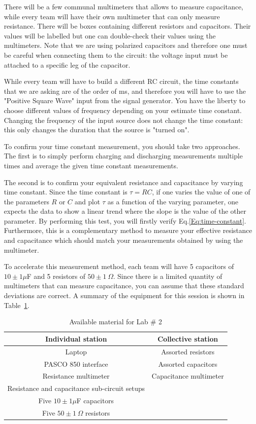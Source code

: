 \documentclass[12pt]{report}
\begin{document}
There will be a few communal multimeters that allows to measure capacitance, while every team will have their own multimeter that can only measure resistance. There will be boxes containing different resistors and capacitors. Their values will be labelled but one can double-check their values using the multimeters. Note that we are using polarized capacitors and therefore one must be careful when connecting them to the circuit: the voltage input must be attached to a specific leg of the capacitor.

While every team will have to build a different RC circuit, the time constants that we are asking are of the order of ms, and therefore you will have to use the "Positive Square Wave" input from the signal generator. You have the liberty to choose different values of frequency depending on your estimate time constant. Changing the frequency of the input source does not change the time constant: this only changes the duration that the source is "turned on".

To confirm your time constant measurement, you should take two approaches. The first is to simply perform charging and discharging measurements multiple times and average the given time constant measurements.

The second is to confirm your equivalent resistance and capacitance by varying time constant. Since the time constant is $\tau = RC$, if one varies the value of one of the parameters $R$ or $C$ and plot $\tau$ as a function of the varying parameter, one expects the data to show a linear trend where the slope is the value of the other parameter. By performing this test, you will firstly verify Eq.\ref{Eq:time-constant}. Furthermore, this is a complementary method to measure your effective resistance and capacitance which should match your measurements obtained by using the multimeter.

To accelerate this measurement method, each team will have 5 capacitors of $10\pm 1\mu$F and 5 resistors of $50\pm 1 \ \Omega$. Since there is a limited quantity of multimeters that can measure capacitance, you can assume that these standard deviations are correct. A summary of the equipment for this session is shown in Table~\ref{Tab:Lab2-material}.
\begin{table}[h]
\centering
\begin{tabular}{||c | c ||}
\hline
Individual station & Collective station\\ \hline
Laptop & Assorted resistors \\
PASCO 850 interface & Assorted capacitors \\
Resistance multimeter & Capacitance multimeter \\
Resistance and capacitance sub-circuit setups & \\
Five $10\pm 1 \mu$F capacitors & \\
Five $50 \pm 1 \ \Omega$ resistors &  \\
\hline
\end{tabular}
\caption{Available material for Lab \# 2}
\label{Tab:Lab2-material}
\end{table}
\end{document}
